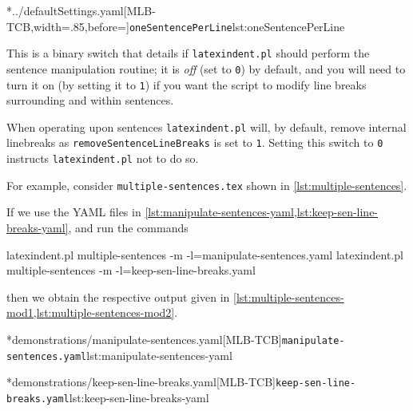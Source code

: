 	\cmhlistingsfromfile*[style=oneSentencePerLine]*{../defaultSettings.yaml}[MLB-TCB,width=.85\linewidth,before=\centering]{\texttt{oneSentencePerLine}}{lst:oneSentencePerLine}

	This is a binary switch that details if \texttt{latexindent.pl} should perform the sentence manipulation routine; it is \emph{off} (set to \texttt{0}) by default, and you will need to turn it on (by setting it to \texttt{1}) if you want the script to modify line breaks surrounding and within sentences.

	When operating upon sentences \texttt{latexindent.pl} will, by default, remove internal linebreaks as \texttt{removeSentenceLineBreaks} is set to \texttt{1}.
	Setting this switch to \texttt{0} instructs \texttt{latexindent.pl} not to do so.

	For example, consider \texttt{multiple-sentences.tex} shown in \cref{lst:multiple-sentences}.


	If we use the YAML files in \cref{lst:manipulate-sentences-yaml,lst:keep-sen-line-breaks-yaml}, and run the commands \begin{widepage} \begin{commandshell}
latexindent.pl multiple-sentences -m -l=manipulate-sentences.yaml
latexindent.pl multiple-sentences -m -l=keep-sen-line-breaks.yaml
	\end{commandshell} \end{widepage} then we obtain the respective output given in \cref{lst:multiple-sentences-mod1,lst:multiple-sentences-mod2}.

	\begin{minipage}{.5\linewidth}
	\end{minipage}
	\hfill
	\begin{minipage}{.5\linewidth}
		\cmhlistingsfromfile*[style=yaml-LST]*{demonstrations/manipulate-sentences.yaml}[MLB-TCB]{\texttt{manipulate-sentences.yaml}}{lst:manipulate-sentences-yaml}
	\end{minipage}

	\begin{minipage}{.5\linewidth}
	\end{minipage}
	\hfill
	\begin{minipage}{.5\linewidth}
		\cmhlistingsfromfile*[style=yaml-LST]*{demonstrations/keep-sen-line-breaks.yaml}[MLB-TCB]{\texttt{keep-sen-line-breaks.yaml}}{lst:keep-sen-line-breaks-yaml}
	\end{minipage}

